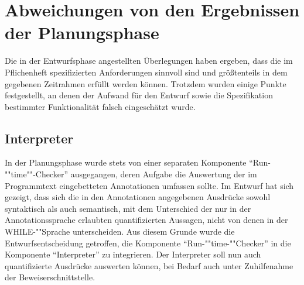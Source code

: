 \section{Abweichungen von den Ergebnissen der Planungsphase}
Die in der Entwurfsphase angestellten Überlegungen haben ergeben, dass die im Pflichenheft spezifizierten Anforderungen sinnvoll sind und größtenteils in dem gegebenen Zeitrahmen erfüllt werden können. Trotzdem wurden einige Punkte festgestellt, an denen der Aufwand für den Entwurf sowie die Spezifikation bestimmter Funktionalität falsch eingeschätzt wurde.

\subsection{Interpreter}
In der Planungsphase wurde stets von einer separaten Komponente "`Run-""time""-Checker"' ausgegangen, deren Aufgabe die Auswertung der im Programmtext eingebetteten Annotationen umfassen sollte. Im Entwurf hat sich gezeigt, dass sich die in den Annotationen angegebenen Ausdrücke sowohl syntaktisch als auch semantisch, mit dem Unterschied der nur in der Annotationssprache erlaubten quantifizierten Aussagen, nicht von denen in der WHILE-""Sprache unterscheiden. Aus diesem Grunde wurde die Entwurfsentscheidung getroffen, die Komponente "`Run-""time-""Checker"' in die Komponente "`Interpreter"' zu integrieren. Der Interpreter soll nun auch quantifizierte Ausdrücke auswerten können, bei Bedarf auch unter Zuhilfenahme der Beweiserschnittstelle.
